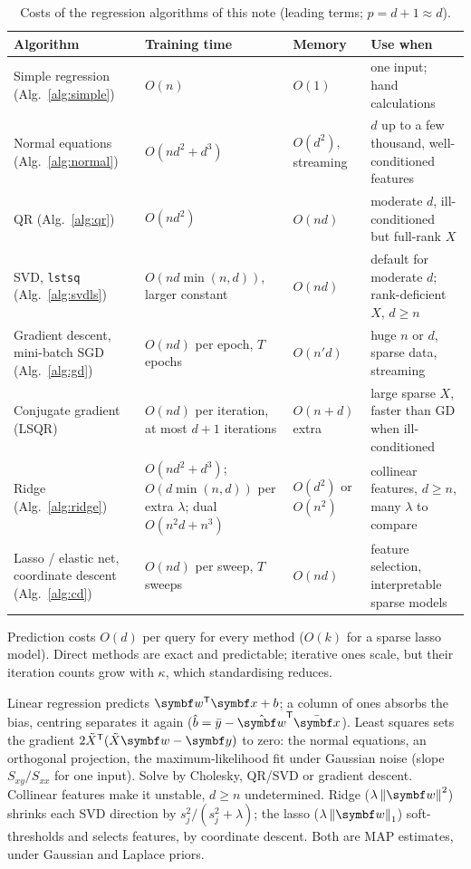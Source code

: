 \documentclass[11pt]{article}
\newcommand{\Xt}{\tilde X}
\newcommand{\w}{\vect{w}}
\newcommand{\y}{\vect{y}}
\begin{document}
\begin{table}[!tbp]
\centering\small
\caption{Costs of the regression algorithms of this note (leading terms; $p = d + 1 \approx d$).}
\label{tab:costs}
\setlength{\tabcolsep}{4pt}
\begin{tabular}{L{3.4cm}L{3.7cm}L{2.1cm}L{5.1cm}}
\toprule
Algorithm & Training time & Memory & Use when \\
\midrule
Simple regression (Alg.~\ref{alg:simple}) & $O(n)$ & $O(1)$ & one input; hand calculations \\
Normal equations (Alg.~\ref{alg:normal}) & $O(nd^2 + d^3)$ & $O(d^2)$, streaming & $d$ up to a few thousand, well-conditioned features \\
QR (Alg.~\ref{alg:qr}) & $O(nd^2)$ & $O(nd)$ & moderate $d$, ill-conditioned but full-rank $X$ \\
SVD, \texttt{lstsq} (Alg.~\ref{alg:svdls}) & $O(nd\min(n,d))$, larger constant & $O(nd)$ & default for moderate $d$; rank-deficient $X$, $d \ge n$ \\
Gradient descent, mini-batch SGD (Alg.~\ref{alg:gd}) & $O(nd)$ per epoch, $T$ epochs & $O(n'd)$ & huge $n$ or $d$, sparse data, streaming \\
Conjugate gradient (LSQR) & $O(nd)$ per iteration, at most $d + 1$ iterations & $O(n + d)$ extra & large sparse $X$, faster than GD when ill-conditioned \\
Ridge (Alg.~\ref{alg:ridge}) & $O(nd^2 + d^3)$; $O(d\min(n,d))$ per extra $\lambda$; dual $O(n^2 d + n^3)$ & $O(d^2)$ or $O(n^2)$ & collinear features, $d \ge n$, many $\lambda$ to compare \\
Lasso / elastic net, coordinate descent (Alg.~\ref{alg:cd}) & $O(nd)$ per sweep, $T$ sweeps & $O(nd)$ & feature selection, interpretable sparse models \\
\bottomrule
\end{tabular}
\end{table}

Prediction costs $O(d)$ per query for every method ($O(k)$ for a sparse lasso model). Direct methods are exact and
predictable; iterative ones scale, but their iteration counts grow with $\kappa$, which standardising reduces.

\begin{keyidea}[Summary]
Linear regression predicts $\w\T\x + b$; a column of ones absorbs the bias, centring separates it again
($\hat b = \bar y - \hat{\w}\T\bar{\x}$). Least squares sets the gradient $2\Xt\T(\Xt\w - \y)$ to zero: the normal equations,
an orthogonal projection, the maximum-likelihood fit under Gaussian noise (slope $S_{xy}/S_{xx}$ for one input). Solve by
Cholesky, QR/SVD or gradient descent. Collinear features make it unstable, $d \ge n$ undetermined. Ridge
($\lambda\norm{\w}^2$) shrinks each SVD direction by $s_j^2/(s_j^2 + \lambda)$; the lasso ($\lambda\norm{\w}_1$)
soft-thresholds and selects features, by coordinate descent. Both are MAP estimates, under Gaussian and Laplace priors.
\end{keyidea}
\end{document}
